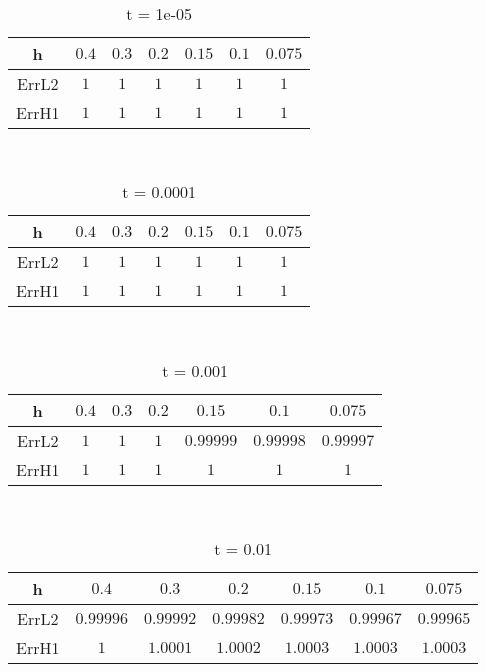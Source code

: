 \documentclass{standalone}
\begin{document}
\clearpage
\hfill \\ 
\begin{table}[!h]
\centering
\begin{tabular}{ | c | c | c | c | c | c | c | }
\hline
h	&	$0.4$ & $0.3$ & $0.2$ & $0.15$ & $0.1$ & $0.075$ \\ \hline
ErrL2	&	$1$ & $1$ & $1$ & $1$ & $1$ & $1$ \\ \hline
ErrH1	&	$1$ & $1$ & $1$ & $1$ & $1$ & $1$ \\ \hline
\end{tabular}
\caption{t = 1e-05 }
\end{table}

\hfill \\ 
\begin{table}[!h]
\centering
\begin{tabular}{ | c | c | c | c | c | c | c | }
\hline
h	&	$0.4$ & $0.3$ & $0.2$ & $0.15$ & $0.1$ & $0.075$ \\ \hline
ErrL2	&	$1$ & $1$ & $1$ & $1$ & $1$ & $1$ \\ \hline
ErrH1	&	$1$ & $1$ & $1$ & $1$ & $1$ & $1$ \\ \hline
\end{tabular}
\caption{t = 0.0001 }
\end{table}

\hfill \\ 
\begin{table}[!h]
\centering
\begin{tabular}{ | c | c | c | c | c | c | c | }
\hline
h	&	$0.4$ & $0.3$ & $0.2$ & $0.15$ & $0.1$ & $0.075$ \\ \hline
ErrL2	&	$1$ & $1$ & $1$ & $0.99999$ & $0.99998$ & $0.99997$ \\ \hline
ErrH1	&	$1$ & $1$ & $1$ & $1$ & $1$ & $1$ \\ \hline
\end{tabular}
\caption{t = 0.001 }
\end{table}

\hfill \\ 
\begin{table}[!h]
\centering
\begin{tabular}{ | c | c | c | c | c | c | c | }
\hline
h	&	$0.4$ & $0.3$ & $0.2$ & $0.15$ & $0.1$ & $0.075$ \\ \hline
ErrL2	&	$0.99996$ & $0.99992$ & $0.99982$ & $0.99973$ & $0.99967$ & $0.99965$ \\ \hline
ErrH1	&	$1$ & $1.0001$ & $1.0002$ & $1.0003$ & $1.0003$ & $1.0003$ \\ \hline
\end{tabular}
\caption{t = 0.01 }
\end{table}


\clearpage
\end{document}
